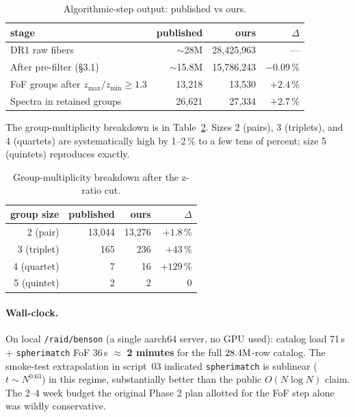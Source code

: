 \documentclass[11pt,letterpaper]{article}
\begin{document}
\begin{table}[ht]
\centering
\caption{Algorithmic-step output: published vs ours.}
\label{tab:headline}
\begin{tabular}{lrrr}
\toprule
stage                                       & published & ours      & $\Delta$ \\
\midrule
DR1 raw fibers                              & $\sim$28M & 28{,}425{,}963 & --- \\
After pre-filter (\S3.1)                    & $\sim$15.8M & 15{,}786{,}243 & $-0.09$\,\% \\
FoF groups after $z_{\max}/z_{\min} \geq 1.3$
                                            & 13{,}218  & 13{,}530  & $+2.4$\,\% \\
Spectra in retained groups                  & 26{,}621  & 27{,}334  & $+2.7$\,\% \\
\bottomrule
\end{tabular}
\end{table}

The group-multiplicity breakdown is in Table~\ref{tab:mult}. Sizes 2
(pairs), 3 (triplets), and 4 (quartets) are systematically high by
1--2\,\% to a few tens of percent; size 5 (quintets) reproduces exactly.

\begin{table}[ht]
\centering
\caption{Group-multiplicity breakdown after the z-ratio cut.}
\label{tab:mult}
\begin{tabular}{rrrr}
\toprule
group size & published & ours & $\Delta$ \\
\midrule
2 (pair)     & 13{,}044 & 13{,}276 & $+1.8$\,\% \\
3 (triplet)  &     165  &     236  & $+43$\,\% \\
4 (quartet)  &       7  &      16  & $+129$\,\% \\
5 (quintet)  &       2  &       2  & $0$       \\
\bottomrule
\end{tabular}
\end{table}

\paragraph{Wall-clock.} On local \texttt{/raid/benson} (a single
aarch64 server, no GPU used): catalog load 71\,s + \texttt{spherimatch}
FoF 36\,s $\approx$ \textbf{2 minutes} for the full $28.4{\rm M}$-row
catalog. The smoke-test extrapolation in script~03 indicated
\texttt{spherimatch} is sublinear ($t \sim N^{0.63}$) in this regime,
substantially better than the public $O(N \log N)$ claim. The 2--4 week
budget the original Phase 2 plan allotted for the FoF step alone was
wildly conservative.
\end{document}
